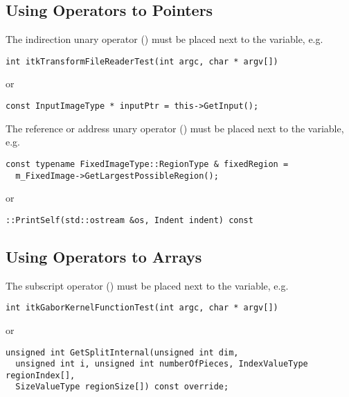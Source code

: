 \subsection{Using Operators to Pointers}
\label{subsec:UsingOperatorsToPointers}

The indirection unary operator (\code{*}) must be placed next to the variable, e.g.

\small
\begin{verbatim}
int itkTransformFileReaderTest(int argc, char * argv[])
\end{verbatim}
\normalsize

or

\small
\begin{verbatim}
const InputImageType * inputPtr = this->GetInput();
\end{verbatim}
\normalsize

The reference or address unary operator (\code{\&}) must be placed next to the
variable, e.g.

\small
\begin{verbatim}
const typename FixedImageType::RegionType & fixedRegion =
  m_FixedImage->GetLargestPossibleRegion();
\end{verbatim}
\normalsize

or

\small
\begin{verbatim}
::PrintSelf(std::ostream &os, Indent indent) const
\end{verbatim}
\normalsize


\subsection{Using Operators to Arrays}
\label{subsec:UsingOperatorsToArrays}

The subscript operator (\code{[]}) must be placed next to the variable, e.g.
\small
\begin{verbatim}
int itkGaborKernelFunctionTest(int argc, char * argv[])
\end{verbatim}
\normalsize

or

\small
\begin{verbatim}
unsigned int GetSplitInternal(unsigned int dim,
  unsigned int i, unsigned int numberOfPieces, IndexValueType regionIndex[],
  SizeValueType regionSize[]) const override;
\end{verbatim}
\normalsize


